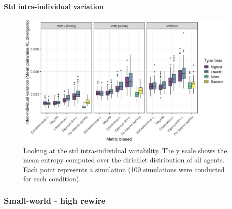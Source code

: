 \documentclass[
]{article}
\begin{document}
\hypertarget{std-intra-individual-variation-3}{%
\paragraph{Std intra-individual
variation}\label{std-intra-individual-variation-3}}

\begin{figure}[!H]

{\centering \includegraphics{./Figures/unnamed-chunk-215-1} 

}

\caption{Looking at the std intra-individual variability. The y scale shows the mean entropy computed over the dirichlet distribution of all agents. Each point represents a simulation (100 simulations were conducted for each condition).}\label{fig:unnamed-chunk-215}
\end{figure}

\hypertarget{small-world---high-rewire}{%
\subsubsection{Small-world - high
rewire}\label{small-world---high-rewire}}
\end{document}
